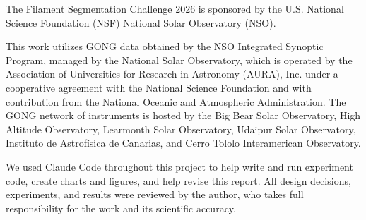\documentclass[sigconf]{acmart}
\begin{document}
    The Filament Segmentation Challenge 2026 is sponsored by the U.S. National Science Foundation (NSF) National Solar Observatory (NSO).

    This work utilizes GONG data obtained by the NSO Integrated Synoptic Program, managed by the National Solar Observatory, which is operated by the Association of Universities for Research in Astronomy (AURA), Inc. under a cooperative agreement with the National Science Foundation and with contribution from the National Oceanic and Atmospheric Administration. The GONG network of instruments is hosted by the Big Bear Solar Observatory, High Altitude Observatory, Learmonth Solar Observatory, Udaipur Solar Observatory, Instituto de Astrofísica de Canarias, and Cerro Tololo Interamerican Observatory.

    We used Claude Code throughout this project to help write and run experiment code, create charts and figures, and help revise this report. All design decisions, experiments, and results were reviewed by the author, who takes full responsibility for the work and its scientific accuracy.



\end{document}
